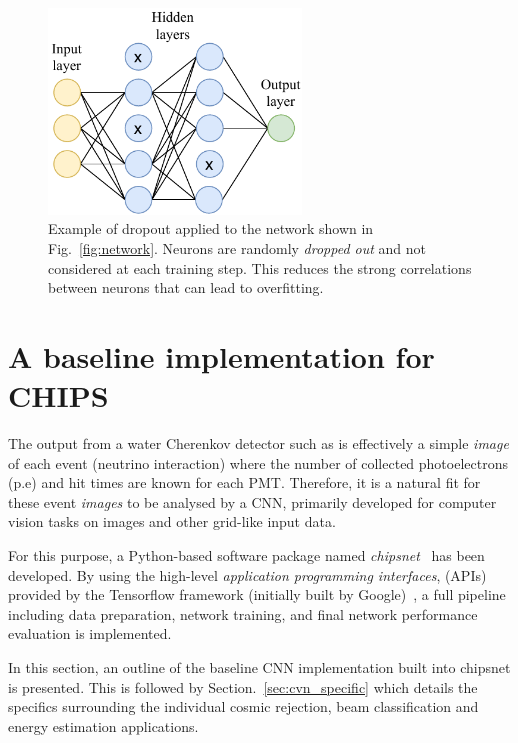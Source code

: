 \begin{figure} %
    \includegraphics[width=0.6\textwidth]{diagrams/6-cvn/dropout.pdf}
    \caption[Illustration of dropout.]
    {Example of dropout applied to the network shown in Fig.~\ref{fig:network}. Neurons are
        randomly \emph{dropped out} and not considered at each training step. This reduces the
        strong correlations between neurons that can lead to overfitting.}
    \label{fig:dropout}
\end{figure}

\section{A baseline implementation for CHIPS} %
\label{sec:cvn_baseline} %

The output from a water Cherenkov detector such as \chips is effectively a simple \emph{image} of
each event (neutrino interaction) where the number of collected photoelectrons (p.e) and hit times
are known for each PMT. Therefore, it is a natural fit for these event \emph{images} to be
analysed by a CNN, primarily developed for computer vision tasks on images and other grid-like
input data.

For this purpose, a Python-based software package named \emph{chipsnet}~\cite{chipsnet2020} has
been developed. By using the high-level \emph{application programming interfaces}, (APIs) provided
by the Tensorflow framework (initially built by Google)~\cite{tf2015}, a full pipeline including
data preparation, network training, and final network performance evaluation is implemented.

In this section, an outline of the baseline CNN implementation built into chipsnet is presented.
This is followed by Section.~\ref{sec:cvn_specific} which details the specifics surrounding the
individual cosmic rejection, beam classification and energy estimation applications.

